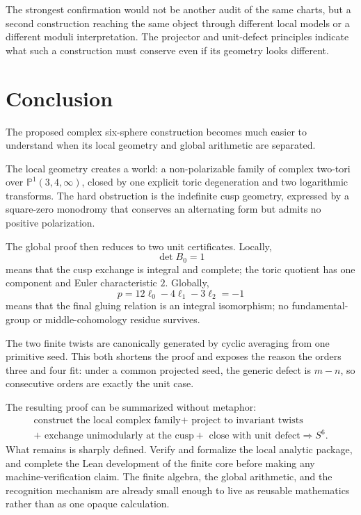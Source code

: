 \documentclass[11pt,reqno]{amsart}
\numberwithin{equation}{section}
\newcommand{\Pone}{\mathbb P^1}
\theoremstyle{definition}
\begin{document}
The strongest confirmation would not be another audit of the same charts, but a second construction reaching the same object through different local models or a different moduli interpretation. The projector and unit-defect principles indicate what such a construction must conserve even if its geometry looks different.

\section{Conclusion}\label{sec:conclusion}

The proposed complex six-sphere construction becomes much easier to understand when its local geometry and global arithmetic are separated.

The local geometry creates a world: a non-polarizable family of complex two-tori over $\Pone(3,4,\infty)$, closed by one explicit toric degeneration and two logarithmic transforms. The hard obstruction is the indefinite cusp geometry, expressed by a square-zero monodromy that conserves an alternating form but admits no positive polarization.

The global proof then reduces to two unit certificates. Locally,
\[
\det B_0=1
\]
means that the cusp exchange is integral and complete; the toric quotient has one component and Euler characteristic $2$. Globally,
\[
p=12\ell_0-4\ell_1-3\ell_2=-1
\]
means that the final gluing relation is an integral isomorphism; no fundamental-group or middle-cohomology residue survives.

The two finite twists are canonically generated by cyclic averaging from one primitive seed. This both shortens the proof and exposes the reason the orders three and four fit: under a common projected seed, the generic defect is $m-n$, so consecutive orders are exactly the unit case.

The resulting proof can be summarized without metaphor:
\[
\boxed{
\begin{gathered}
\text{construct the local complex family}
+\text{ project to invariant twists}
\\
+\text{ exchange unimodularly at the cusp}
+\text{ close with unit defect}
\Longrightarrow S^6.
\end{gathered}
}
\]
What remains is sharply defined. Verify and formalize the local analytic package, and complete the Lean development of the finite core before making any machine-verification claim. The finite algebra, the global arithmetic, and the recognition mechanism are already small enough to live as reusable mathematics rather than as one opaque calculation.
\end{document}
